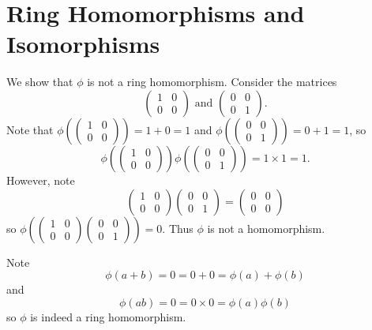 \section{Ring Homomorphisms and Isomorphisms}
\begin{questions}
    \item We show that $\phi$ is not a ring homomorphism. Consider the matrices
    \[
        \begin{pmatrix}1&0\\0&0\end{pmatrix} \text{ and } \begin{pmatrix}0&0\\0&1\end{pmatrix}.
    \]
    Note that $\phi\left(\begin{pmatrix}1&0\\0&0\end{pmatrix}\right) = 1 + 0 = 1$ and $\phi\left(\begin{pmatrix}0&0\\0&1\end{pmatrix}\right) = 0 + 1 = 1$, so
    \[
        \phi\left(\begin{pmatrix}1&0\\0&0\end{pmatrix}\right)\phi\left(\begin{pmatrix}0&0\\0&1\end{pmatrix}\right) = 1 \times 1 = 1.
    \]
    However, note
    \[
        \begin{pmatrix}1&0\\0&0\end{pmatrix}\begin{pmatrix}0&0\\0&1\end{pmatrix} = \begin{pmatrix}0&0\\0&0\end{pmatrix}
    \]
    so $\phi\left(\begin{pmatrix}1&0\\0&0\end{pmatrix}\begin{pmatrix}0&0\\0&1\end{pmatrix}\right) = 0$. Thus $\phi$ is not a homomorphism.

    \item Note
    \[
        \phi(a+b) = 0 = 0 + 0 = \phi(a) + \phi(b)
    \]
    and
    \[
        \phi(ab) = 0 = 0\times0 = \phi(a)\phi(b)
    \]
    so $\phi$ is indeed a ring homomorphism.


\end{questions}
